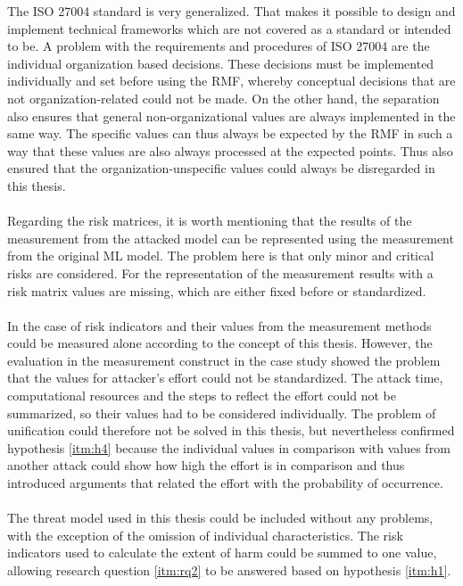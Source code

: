 The ISO 27004 \cite{ISO_27004_2009} standard is very generalized. That makes it possible to design and implement technical frameworks which are not covered as a standard or intended to be. A problem with the requirements and procedures of ISO 27004 are the individual organization based decisions. These decisions must be implemented individually and set before using the RMF, whereby conceptual decisions that are not organization-related could not be made. On the other hand, the separation also ensures that general non-organizational values are always implemented in the same way. The specific values can thus always be expected by the RMF in such a way that these values are also always processed at the expected points. Thus also ensured that the organization-unspecific values could always be disregarded in this thesis. \\ \\
Regarding the risk matrices, it is worth mentioning that the results of the measurement from the attacked model can be represented using the measurement from the original ML model. The problem here is that only minor and critical risks are considered. For the representation of the measurement results with a risk matrix values are missing, which are either fixed before or standardized. \\ \\
In the case of risk indicators and their values from the measurement methods could be measured alone according to the concept of this thesis. However, the evaluation in the measurement construct in the case study showed the problem that the values for attacker's effort could not be standardized. The attack time, computational resources and the steps to reflect the effort could not be summarized, so their values had to be considered individually. The problem of unification could therefore not be solved in this thesis, but nevertheless confirmed hypothesis \ref{itm:h4} because the individual values in comparison with values from another attack could show how high the effort is in comparison and thus introduced arguments that related the effort with the probability of occurrence. \\ \\
The threat model used in this thesis could be included without any problems, with the exception of the omission of individual characteristics. The risk indicators used to calculate the extent of harm could be summed to one value, allowing research question \ref{itm:rq2} to be answered based on hypothesis \ref{itm:h1}.

